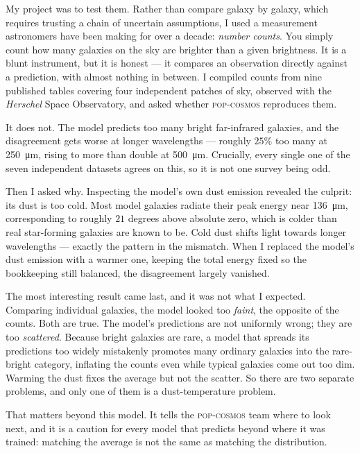 \documentclass[12pt,twoside]{report}
\begin{document}
My project was to test them. Rather than compare galaxy by galaxy, which requires
trusting a chain of uncertain assumptions, I used a measurement astronomers have been
making for over a decade: \emph{number counts}. You simply count how many galaxies on
the sky are brighter than a given brightness. It is a blunt instrument, but it is
honest --- it compares an observation directly against a prediction, with almost
nothing in between. I compiled counts from nine published tables covering four
independent patches of sky, observed with the \emph{Herschel} Space Observatory, and
asked whether \textsc{pop-cosmos} reproduces them.

It does not. The model predicts too many bright far-infrared galaxies, and the
disagreement gets worse at longer wavelengths --- roughly $25\%$ too many at
\SI{250}{\micro\metre}, rising to more than double at \SI{500}{\micro\metre}. Crucially,
every single one of the seven independent datasets agrees on this, so it is not one
survey being odd.

Then I asked why. Inspecting the model's own dust emission revealed the culprit: its
dust is too cold. Most model galaxies radiate their peak energy near
\SI{136}{\micro\metre}, corresponding to roughly $21$ degrees above absolute zero, which
is colder than real star-forming galaxies are known to be. Cold dust shifts light
towards longer wavelengths --- exactly the pattern in the mismatch. When I replaced the
model's dust emission with a warmer one, keeping the total energy fixed so the
bookkeeping still balanced, the disagreement largely vanished.

The most interesting result came last, and it was not what I expected. Comparing
individual galaxies, the model looked too \emph{faint}, the opposite of the counts.
Both are true. The model's predictions are not uniformly wrong; they are too
\emph{scattered}. Because bright galaxies are rare, a model that spreads its
predictions too widely mistakenly promotes many ordinary galaxies into the rare-bright
category, inflating the counts even while typical galaxies come out too dim. Warming
the dust fixes the average but not the scatter. So there are two separate problems, and
only one of them is a dust-temperature problem.

That matters beyond this model. It tells the \textsc{pop-cosmos} team where to look
next, and it is a caution for every model that predicts beyond where it was trained:
matching the average is not the same as matching the distribution.
\end{document}
